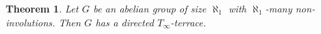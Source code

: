 \documentclass{amsart}
\newtheorem{theorem}{Theorem}
\theoremstyle{definition}
\theoremstyle{remark}
\renewcommand{\P}{\mathbb{P}}
\renewcommand{\c}{\mathfrak{c}}
\DeclareMathOperator{\ran}{range}
\DeclareMathOperator{\dom}{dom}
\newcommand{\st}{\; | \;}
\newcommand{\set}[2]{\left\{#1\st #2 \right\}}
\newcommand{\rest}{\mathbin{\upharpoonright}}
\renewcommand{\a}{\textup{\textbf{a}}}
\renewcommand{\c}{\textup{\textbf{c}}}
\renewcommand{\d}{\textup{\textbf{d}}}
\newcommand{\e}{\textup{\textbf{e}}}
\begin{document}
\begin{theorem}
Let $G$ be an abelian group of size $\aleph_1$ with $\aleph_1$-many non-involutions. Then $G$ has a directed $T_\infty$-terrace. 
\end{theorem}
%
%	
\end{document}
